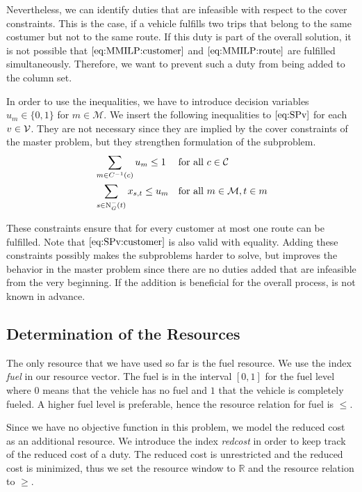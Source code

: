 Nevertheless, we can identify duties that are infeasible with respect to the cover constraints. This is the case, if a vehicle fulfills two trips that belong to the same costumer but not to the same route. If this duty is part of the overall solution, it is not possible that $\eqref{eq:MMILP:customer}$ and $\eqref{eq:MMILP:route}$ are fulfilled simultaneously. Therefore, we want to prevent such a duty from being added to the column set.

In order to use the inequalities, we have to introduce decision variables $u_m\in\{0,1\}$ for $m\in\mathcal{M}$. We insert the following inequalities to $\eqref{eq:SPv}$ for each $v\in\mathcal{V}$. They are not necessary since they are implied by the cover constraints of the master problem, but they strengthen formulation of the subproblem.
\begin{align}
	& \sum_{m\in C^{-1}(c)} u_m \leq 1 && \text{for all } c\in\mathcal{C} \label{eq:SPv:customer} \\
	& \sum_{s\in\operatorname{N}_G^-(t)} x_{s,t} \leq u_m && \text{for all } m\in\mathcal{M}, t\in m \label{eq:SPv:route}
\end{align}

These constraints ensure that for every customer at most one route can be fulfilled. Note that $\eqref{eq:SPv:customer}$ is also valid with equality. Adding these constraints possibly makes the subproblems harder to solve, but improves the behavior in the master problem since there are no duties added that are infeasible from the very beginning. If the addition is beneficial for the overall process, is not known in advance.


\subsection{Determination of the Resources}
\label{sec:resources}

The only resource that we have used so far is the fuel resource. We use the index \emph{fuel} in our resource vector. The fuel is in the interval $[0,1]$ for the fuel level where $0$ means that the vehicle has no fuel and $1$ that the vehicle is completely fueled. A higher fuel level is preferable, hence the resource relation for fuel is $\leq$.

Since we have no objective function in this problem, we model the reduced cost as an additional resource. We introduce the index \emph{redcost} in order to keep track of the reduced cost of a duty. The reduced cost is unrestricted and the reduced cost is minimized, thus we set the resource window to $\mathbb{R}$ and the resource relation to $\geq$.

